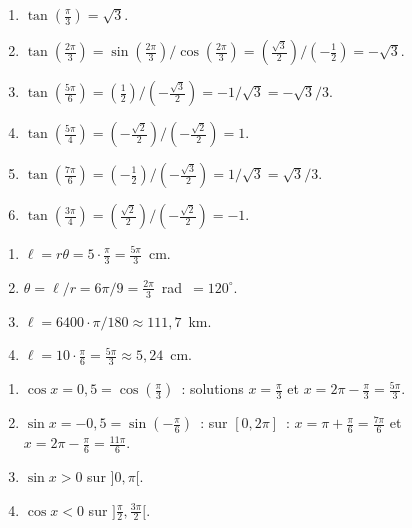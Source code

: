 
\begin{enumerate}
  \item $\tan(\frac{\pi}{3})=\sqrt{3}$.
  \item $\tan(\frac{2\pi}{3})=\sin(\frac{2\pi}{3})/\cos(\frac{2\pi}{3})=(\frac{\sqrt{3}}{2})/(-\frac{1}{2})=-\sqrt{3}$.
  \item $\tan(\frac{5\pi}{6})=(\frac{1}{2})/(-\frac{\sqrt{3}}{2})=-1/\sqrt{3}=-\sqrt{3}/3$.
  \item $\tan(\frac{5\pi}{4})=(-\frac{\sqrt{2}}{2})/(-\frac{\sqrt{2}}{2})=1$.
  \item $\tan(\frac{7\pi}{6})=(-\frac{1}{2})/(-\frac{\sqrt{3}}{2})=1/\sqrt{3}=\sqrt{3}/3$.
  \item $\tan(\frac{3\pi}{4})=(\frac{\sqrt{2}}{2})/(-\frac{\sqrt{2}}{2})=-1$.
\end{enumerate}


\begin{enumerate}
  \item $\ell=r\theta=5\cdot\frac{\pi}{3}=\frac{5\pi}{3}$~cm.
  \item $\theta=\ell/r=6\pi/9=\frac{2\pi}{3}$~rad~$=120^{\circ}$.
  \item $\ell=6400\cdot\pi/180\approx111{,}7$~km.
  \item $\ell=10\cdot\frac{\pi}{6}=\frac{5\pi}{3}\approx5{,}24$~cm.
\end{enumerate}


\begin{enumerate}
  \item $\cos x=0{,}5=\cos(\frac{\pi}{3})$~: solutions $x=\frac{\pi}{3}$ et $x=2\pi-\frac{\pi}{3}=\frac{5\pi}{3}$.\checkmark
  \item $\sin x=-0{,}5=\sin(-\frac{\pi}{6})$~: sur $[0,2\pi]$~: $x=\pi+\frac{\pi}{6}=\frac{7\pi}{6}$ et $x=2\pi-\frac{\pi}{6}=\frac{11\pi}{6}$.
  \item $\sin x>0$ sur $]0,\pi[$.
  \item $\cos x<0$ sur $]\frac{\pi}{2},\frac{3\pi}{2}[$.
\end{enumerate}


